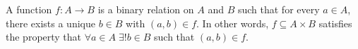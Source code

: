 A function $f: A \rightarrow B$ is a binary relation on $A$ and $B$ such that for every $a \in A$, there exists a unique $b \in B$ with $(a, b) \in f$. In other words, $f \subseteq A \times B$ satisfies the property that $\forall a \in A \; \exists! b \in B$ such that $(a, b) \in f$.
